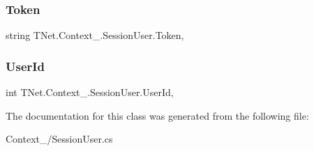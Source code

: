 \subsubsection{\texorpdfstring{Token}{Token}}
{\footnotesize\ttfamily string T\+Net.\+Context\+\_\+.\+Session\+User.\+Token\hspace{0.3cm}{\ttfamily [get]}, {\ttfamily [set]}}





\mbox{\label{class_t_net_1_1_context___1_1_session_user_a04ab0e41d46af9a3b656d8d8dd46f063}} 
\subsubsection{\texorpdfstring{User\+Id}{UserId}}
{\footnotesize\ttfamily int T\+Net.\+Context\+\_\+.\+Session\+User.\+User\+Id\hspace{0.3cm}{\ttfamily [get]}, {\ttfamily [set]}}







The documentation for this class was generated from the following file\+:\begin{DoxyCompactItemize}
\item 
Context\+\_\+/Session\+User.\+cs\end{DoxyCompactItemize}

